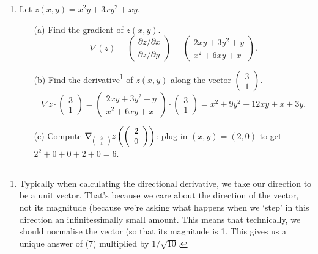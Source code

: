 \documentclass[11pt,a4paper]{scrartcl}
\begin{document}
\begin{enumerate}
\item Let $z(x,y) = x^2y + 3xy^2 + xy$.
\begin{itemize}
	\item[(a)] Find the gradient of $z(x,y)$.
          \begin{equation}
            \nabla(z)=
          \left(\begin{array}{c} \partial z/\partial x \\
		                    \partial z/\partial y\end{array}\right)
		                    =
		              \left(\begin{array}{c}
		              2xy + 3y^2 + y \\
		              x^2 + 6xy + x
		              \end{array}\right).\end{equation}
	\item[(b)] Find the derivative\footnote{Typically when calculating the directional derivative, we take our direction to be a unit vector. That's because we care about the direction of the vector, not its magnitude (because we're asking what happens when we `step' in this direction an infinitessimally small amount. This means that technically, we should normalise the vector (so that its magnitude is 1. This gives us a unique answer of (7) multiplied by $1/\sqrt{10}$.} of $z(x,y)$ along the vector $\left(\begin{array}{c} 3 \\ 1 \end{array}\right).$
          \begin{equation}
          \nabla z \cdot \left(\begin{array}{c}
		3 \\ 1
		\end{array}\right) 
		= 
		\left(\begin{array}{c}
		              2xy + 3y^2 + y \\
		              x^2 + 6xy + x
		              \end{array}\right)
		              \cdot 
		              \left(\begin{array}{c}
		3 \\ 1
		\end{array}\right) 
		= x^2 + 9y^2 + 12xy + x + 3y.
\end{equation}
        \item[(c)] Compute $\nabla_{\tiny\left(\begin{array}{c} 3 \\ 1 \end{array}\right)} z \left(\left(\begin{array}{c} 2 \\ 0 \end{array}\right)\right)$: plug in $(x,y)=(2,0)$ to get $2^2 + 0 + 0 + 2 + 0 = 6$.

\end{itemize}
\end{enumerate}
\end{document}
